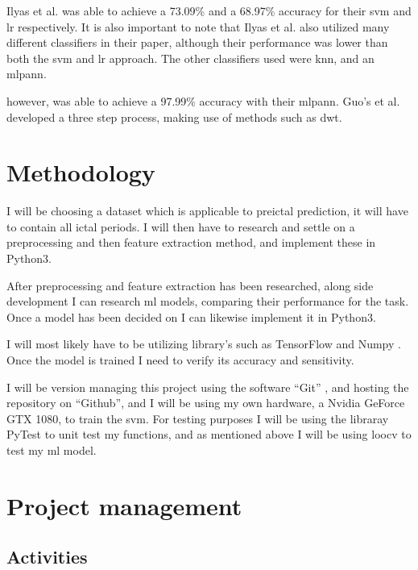 \documentclass[12pt]{article}
\begin{document}
Ilyas et al. \cite{ilyas} was able to achieve a 73.09\% and a 68.97\% accuracy for their \acrshort{svm} and \acrfull{lr} respectively. It is also important to note that Ilyas et al. also utilized many different classifiers in their paper, although their performance was lower than both the \acrshort{svm} and \acrshort{lr} approach. The other classifiers used were \acrfull{knn}, and an \acrfull{mlpann}.

\cite{guo} however, was able to achieve a 97.99\% accuracy with their \acrshort{mlpann}. Guo's et al. developed a three step process, making use of methods such as \acrfull{dwt}.


\section{Methodology}

I will be choosing a dataset which is applicable to preictal prediction, it will have to contain all ictal periods. I will then have to research and settle on a preprocessing and then feature extraction method, and implement these in Python3. 

After preprocessing and feature extraction has been researched, along side development I can research \acrshort{ml} models, comparing their performance for the task. Once a model has been decided on I can likewise implement it in Python3.

I will most likely have to be utilizing library's such as TensorFlow \cite{tensorflow2015-whitepaper} and Numpy \cite{harris2020array}. Once the model is trained I need to verify its accuracy and sensitivity.

I will be version managing this project using the software ``Git'' , and hosting the repository on ``Github'', and I will be using my own hardware, a Nvidia GeForce GTX 1080, to train the \acrshort{svm}. For testing purposes I will be using the libraray PyTest to unit test my functions, and as mentioned above I will be using \acrshort{loocv} to test my \acrshort{ml} model.

\section{Project management}
\subsection{Activities}
\end{document}
